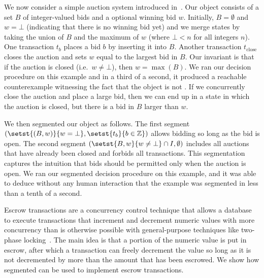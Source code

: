 \example[Auction]
We now consider a simple auction system introduced in~\cite{gotsman2016cause}.
Our object consists of a set $B$ of integer-valued bids and a optional winning
bid $w$. Initially, $B = \emptyset$ and $w = \bot$ (indicating that there is no
winning bid yet) and we merge states by taking the union of $B$ and the maximum
of $w$ (where $\bot < n$ for all integers $n$). One transaction $t_b$ places a
bid $b$ by inserting it into $B$. Another transaction $t_\text{close}$ closes
the auction and sets $w$ equal to the largest bid in $B$. Our invariant is that
if the auction is closed (i.e.\ $w \neq \bot$), then $w = \max(B)$. We ran our
decision procedure on this example and in a third of a second, it produced a
reachable counterexample witnessing the fact that the object is not
\invariantconfluent{}.  If we concurrently close the auction and place a large
bid, then we can end up in a state in which the auction is closed, but there is
a bid in $B$ larger than $w$.

We then segmented our object as follows. The first segment $(\setst{(B, w)}{w =
\bot}, \setst{t_b}{b \in \ints})$ allows bidding so long as the bid is open.
The second segment $(\setst{B, w}{w \neq \bot} \cap I, \emptyset)$ includes all
auctions that have already been closed and forbids all transactions. This
segmentation captures the intuition that bids should be permitted only when the
auction is open. We ran our segmented \invariantconfluence{} decision procedure
on this example, and it was able to deduce without any human interaction that
the example was segmented \invariantconfluent{} in less than a tenth of a
second.

Escrow transactions are a concurrency control technique that allows a database
to execute transactions that increment and decrement numeric values with more
concurrency than is otherwise possible with general-purpose techniques like
two-phase locking~\cite{o1986escrow}. The main idea is that a portion of the
numeric value is put in escrow, after which a transaction can freely decrement
the value so long as it is not decremented by more than the amount that has
been escrowed. We show how segmented \invariantconfluence{} can be used to
implement escrow transactions.

